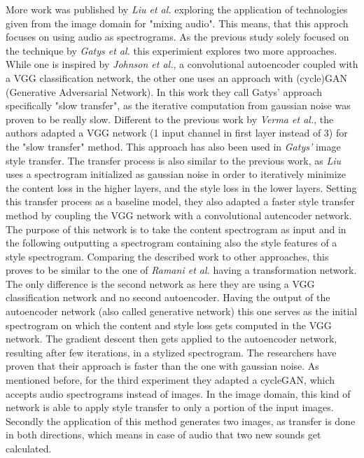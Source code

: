 More work was published by \textit{Liu et al.} \cite{Liu2019} exploring the application of technologies given from the image domain for "mixing audio". This means, that this approch focuses on using audio as spectrograms. As the previous study solely focused on the technique by \textit{Gatys et al.} this experimient explores two more approaches. While one is inspired by \textit{Johnson et al.}, a convolutional autoencoder coupled with a VGG classification network, the other one uses an approach with (cycle)GAN (Generative Adversarial Network). In this work they call Gatys' approach specifically "slow transfer", as the iterative computation from gaussian noise was proven to be really slow. Different to the previous work by \textit{Verma et al.}, the authors adapted a VGG network (1 input channel in first layer instead of 3) for the "slow transfer" method. This approach has also been used in \textit{Gatys'} image style transfer. The transfer process is also similar to the previous work, as \textit{Liu} uses a spectrogram initialized as gaussian noise in order to iteratively minimize the content loss in the higher layers, and the style loss in the lower layers. Setting this transfer process as a baseline model, they also adapted a faster style transfer method by coupling the VGG network with a convolutional autencoder network. The purpose of this network is to take the content spectrogram as input and in the following outputting a spectrogram containing also the style features of a style spectrogram. Comparing the described work to other approaches, this proves to be similar to the one of \textit{Ramani et al.} having a transformation network. The only difference is the second network as here they are using a VGG classification network and no second autoencoder. Having the output of the autoencoder network (also called generative network) this one serves as the initial spectrogram on which the content and style loss gets computed in the VGG network. The gradient descent then gets applied to the autoencoder network, resulting after few iterations, in a stylized spectrogram. The researchers have proven that their approach is faster than the one with gaussian noise. As mentioned before, for the third experiment they adapted a cycleGAN, which accepts audio spectrograms instead of images. In the image domain, this kind of network is able to apply style transfer to only a portion of the input images. Secondly the application of this method generates two images, as transfer is done in both directions, which means in case of audio that two new sounds get calculated.\\
